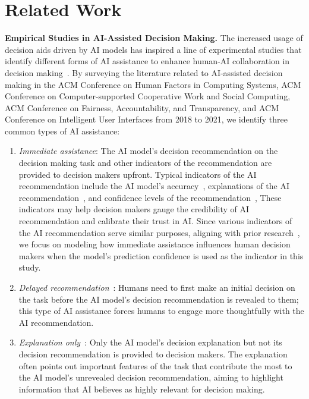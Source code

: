 \documentclass[letterpaper]{article} %
\begin{document}
\section{Related Work}
\noindent\textbf{Empirical Studies in AI-Assisted
Decision Making.} The increased usage of decision aids driven by AI models has inspired a line of experimental studies that identify different forms of AI assistance to enhance human-AI collaboration in decision making~\cite{Lai2023TowardsAS}.  By surveying the literature related to AI-assisted decision making in the ACM Conference on Human Factors in Computing Systems, ACM Conference on Computer-supported Cooperative Work and
Social Computing, ACM Conference on Fairness, Accountability, and Transparency, and ACM Conference on Intelligent User Interfaces from 2018 to 2021, we identify three common types of AI assistance:
\begin{enumerate}
    \item \emph{Immediate assistance}: The AI model's decision recommendation on the decision making task and other indicators of the recommendation are provided to decision makers upfront. Typical indicators of the AI recommendation include the AI model's accuracy~\cite{Lai2020WhyI}, explanations of the AI recommendation~\cite{PoursabziSangdeh2018ManipulatingAM,Cheng2019ExplainingDA,SmithRenner2020NoEW,Liu2021UnderstandingTE,Tsai2021ExploringAP, Bansal2020DoesTW,Zhang2020EffectOC}, and confidence levels of the recommendation~\cite{Green2019ThePA, Guo2019VisualizingUA,Zhang2020EffectOC,Levy2021AssessingTI},  These indicators may help decision makers gauge the credibility of AI recommendation and calibrate their trust in AI. Since various indicators of the AI recommendation serve similar purposes, aligning with prior research~\cite{tejeda2022ai,wang2022will},
    we focus on modeling how immediate assistance influences human decision makers when the model's prediction confidence is used as the indicator in this study.

    \item \emph{Delayed recommendation}~\cite{Park2019ASA,GrgicHlaca2019HumanDM,Lu2021HumanRO,Buccinca2021ToTO,Fogliato2022WhoGF,Ma2023WhoSI}: Humans need to first make an initial decision on the task before the AI model's decision recommendation is revealed to them; this type of AI assistance forces humans to  engage more thoughtfully with the AI recommendation.

    \item \emph{Explanation only}~\cite{Lucic2019WhyDM, Alqaraawi2020EvaluatingSM,Rader2018ExplanationsAM,Schuff2022HumanIO,Berkel2021EffectOI}: Only the AI model's decision explanation but not its decision recommendation is provided to decision makers. The explanation often points out important features of the task that contribute the most to the AI model's unrevealed decision recommendation, aiming to highlight information that AI believes as highly relevant for decision making.

\end{enumerate}
\end{document}
